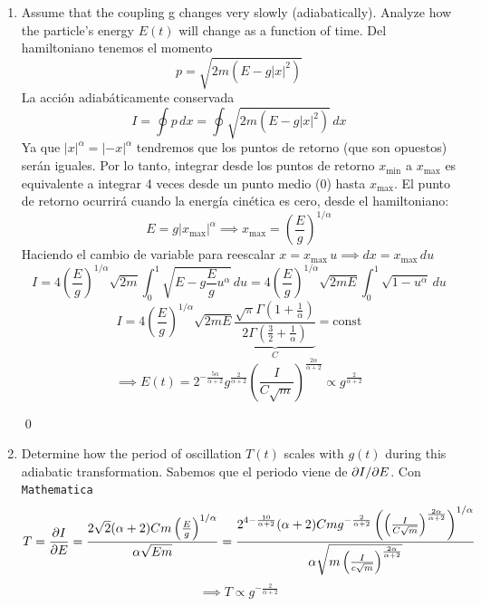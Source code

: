 \documentclass[]{article}
\numberwithin{equation}{section}
\begin{document}
 \begin{enumerate}
 	\item[i.] Assume that the coupling g changes very slowly (adiabatically). Analyze how the particle's energy $E(t)$ will change as a function of time.
 	\resp Del hamiltoniano tenemos el momento
 	\begin{equation}
 		p = \sqrt{2 m \left(E - g |x|^2\right)}
 	\end{equation}
 	La acción adiabáticamente conservada
 	\begin{equation}
 		I = \oint p \, dx = \oint \sqrt{2 m \left(E - g |x|^2\right)} \, dx
 	\end{equation}
 	Ya que $|x|^\alpha = |-x|^\alpha$ tendremos que los puntos de retorno (que son opuestos) serán iguales. Por lo tanto, integrar desde los puntos de retorno $x_{\mathrm{min}}$ a $x_{\mathrm{max}}$ es equivalente a integrar 4 veces desde un punto medio (0) hasta $x_{\mathrm{max}}$. El punto de retorno ocurrirá cuando la energía cinética es cero, desde el hamiltoniano:
 	\begin{equation}
 		E = g |x_\mathrm{max}|^\alpha \implies x_\mathrm{max} = \left(\frac{E}{g}\right)^{1/\alpha}
 	\end{equation}
 	Haciendo el cambio de variable para reescalar $x = x_\mathrm{max} \, u \implies dx = x_\mathrm{max} \, du$
 	\begin{equation}
 		I = 4 \left(\frac{E}{g}\right)^{1/\alpha} \sqrt{2 m } \int_0^{1} \sqrt{E - g \frac{E}{g} u^\alpha} \, du = 4 \left(\frac{E}{g}\right)^{1/\alpha} \sqrt{2 m E} \int_0^{1} \sqrt{1 - u^\alpha} \, du
 	\end{equation}
 	\begin{equation}
 		I =  4 \left(\frac{E}{g}\right)^{1/\alpha} \sqrt{2 m E} \underbrace{\frac{\sqrt{\pi } \Gamma \left(1+\frac{1}{\alpha }\right)}{2 \Gamma \left(\frac{3}{2}+\frac{1}{\alpha }\right)}}_{C} = \mathrm{const}
 	\end{equation}
 	\begin{equation}
 		\implies E(t) = 2^{-\frac{5 \alpha }{\alpha +2}} g^{\frac{2}{\alpha +2}} \left(\frac{I}{C \sqrt{m}}\right)^{\frac{2 \alpha }{\alpha +2}} \propto g^{\frac{2}{\alpha +2}}
 	\end{equation}
 	
 	\qed
 	
 	\item[ii.] Determine how the period of oscillation $T (t)$ scales with $g(t)$ during this adiabatic transformation.
 	\resp Sabemos que el periodo viene de $\partial I/\partial E$. Con \texttt{Mathematica}
 	\begin{equation}
 		T = \dfrac{\partial I}{\partial E} = \frac{2 \sqrt{2} (\alpha +2) C m \left(\frac{E}{g}\right)^{1/\alpha }}{\alpha  \sqrt{E m}} = \frac{2^{4-\frac{10}{\alpha +2}} (\alpha +2) C m g^{-\frac{2}{\alpha +2}} \left(\left(\frac{I}{C \sqrt{m}}\right)^{\frac{2 \alpha }{\alpha +2}}\right)^{1/\alpha }}{\alpha  \sqrt{m \left(\frac{I}{c \sqrt{m}}\right)^{\frac{2 \alpha }{\alpha +2}}}} 
 	\end{equation}
 	\begin{equation}
 		\implies T \propto g^{-\frac{2}{\alpha +2}}
 	\end{equation}
 	

\end{enumerate}
\end{document}
